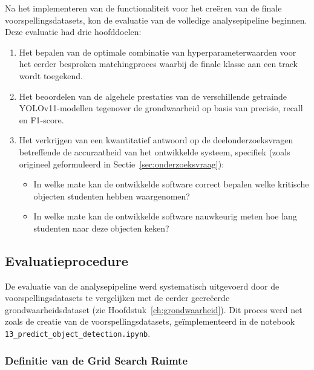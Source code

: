 Na het implementeren van de functionaliteit voor het creëren van de finale voorspellingsdatasets, 
kon de evaluatie van de volledige analysepipeline beginnen.\\ Deze evaluatie had drie hoofddoelen:
\begin{enumerate}
    \item Het bepalen van de optimale combinatie van hyperparameterwaarden voor het eerder besproken matchingproces waarbij de finale klasse aan een track wordt toegekend.
    \item Het beoordelen van de algehele prestaties van de verschillende getrainde\\ YOLOv11-modellen tegenover de grondwaarheid op basis van precisie, recall en F1-score.
    \item Het verkrijgen van een kwantitatief antwoord op de deelonderzoeksvragen betreffende de accuraatheid van het 
    ontwikkelde systeem, specifiek (zoals origineel geformuleerd in Sectie~\ref{sec:onderzoeksvraag}):
        \begin{itemize}
            \item In welke mate kan de ontwikkelde software correct bepalen welke kritische objecten studenten hebben waargenomen?
            \item In welke mate kan de ontwikkelde software nauwkeurig meten hoe lang studenten naar deze objecten keken?
        \end{itemize}
\end{enumerate}

\subsection{Evaluatieprocedure}

De evaluatie van de analysepipeline werd systematisch uitgevoerd door de voorspellingsdatasets 
te vergelijken met de eerder gecreëerde grondwaarheidsdataset (zie Hoofdstuk~\ref{ch:grondwaarheid}). 
Dit proces werd net zoals de creatie van de voorspellingsdatasets,
geïmplementeerd in de notebook \texttt{13\_predict\_object\_detection.ipynb}.

\subsubsection{Definitie van de Grid Search Ruimte}

